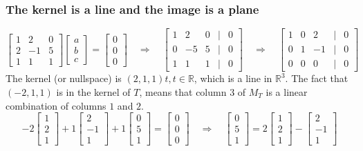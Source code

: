 \documentclass[a4paper, 9pt]{extarticle}
\begin{document}
\subsubsection{The kernel is a line and the image is a plane}
$$
  \begin{bmatrix}
    1 & 2  & 0 \\
    2 & -1 & 5 \\
    1 & 1  & 1
  \end{bmatrix}
  \begin{bmatrix}
    a \\
    b \\
    c
  \end{bmatrix}
  =
  \begin{bmatrix}
    0 \\
    0 \\
    0
  \end{bmatrix}
  \quad \Rightarrow \quad
  \begin{bmatrix}
    1 & 2  & 0 & | & 0 \\
    0 & -5 & 5 & | & 0 \\
    1 & 1  & 1 & | & 0
  \end{bmatrix}
  \quad \Rightarrow \quad
  \begin{bmatrix}
    1 & 0 & 2  & | & 0 \\
    0 & 1 & -1 & | & 0 \\
    0 & 0 & 0  & | & 0
  \end{bmatrix}
$$
The kernel (or nullspace) is $(2, 1, 1)t, t \in \mathbb{R}$, which is a line in $\mathbb{R}^3$. The fact that $(-2, 1, 1)$ is in the kernel of $T$, means that column 3 of $M_T$ is a linear combination of columns $1$ and $2$.
$$
  -2
  \begin{bmatrix}
    1 \\
    2 \\
    1
  \end{bmatrix}
  +
  1
  \begin{bmatrix}
    2  \\
    -1 \\
    1
  \end{bmatrix}
  +
  1
  \begin{bmatrix}
    0 \\
    5 \\
    1
  \end{bmatrix}
  =
  \begin{bmatrix}
    0 \\
    0 \\
    0
  \end{bmatrix}
  \quad \Longrightarrow \quad
  \begin{bmatrix}
    0 \\
    5 \\
    1
  \end{bmatrix}
  =
  2
  \begin{bmatrix}
    1 \\
    2 \\
    1
  \end{bmatrix}
  -
  \begin{bmatrix}
    2  \\
    -1 \\
    1
  \end{bmatrix}
$$
\end{document}
